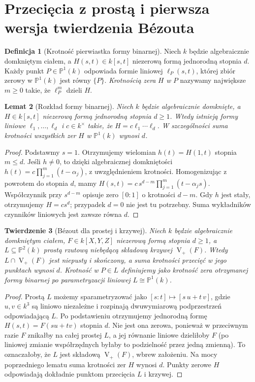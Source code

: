 \documentclass[11pt,a4paper,openany]{report}
\numberwithin{equation}{section}
\theoremstyle{plain}
\newtheorem{twierdzenie}{Twierdzenie}[section]
\newtheorem{lemat}[twierdzenie]{Lemat}
\theoremstyle{definition}
\newtheorem{definicja}[twierdzenie]{Definicja}
\theoremstyle{remark}
\newcommand{\PP}{\mathbb P}
\newcommand{\V}{\operatorname V}
\begin{document}
\section{Przecięcia z prostą i pierwsza wersja twierdzenia Bézouta}

\begin{definicja}[Krotność pierwiastka formy binarnej]
Niech $k$ będzie algebraicznie domkniętym ciałem,
a $H(s,t)\in k[s,t]$ niezerową formą jednorodną stopnia $d$.
Każdy punkt $P\in\PP^1(k)$ odpowiada formie liniowej
$\ell_P(s,t)$, której zbiór zerowy w $\PP^1(k)$ jest
równy $\{P\}$. \emph{Krotnością zera $H$ w $P$} nazywamy
największe $m\ge0$ takie, że $\ell_P^m$ dzieli $H$.
\end{definicja}

\begin{lemat}[Rozkład formy binarnej]
Niech $k$ będzie algebraicznie domknięte,
a $H\in k[s,t]$ niezerową formą jednorodną stopnia $d\ge1$.
Wtedy istnieją formy liniowe $\ell_1,\ldots,\ell_d$
i $c\in k^\times$ takie, że $H=c\ell_1\cdots\ell_d$.
W szczególności suma krotności wszystkich zer $H$ w $\PP^1(k)$
wynosi $d$.
\end{lemat}
\begin{proof}
Podstawmy $s=1$. Otrzymujemy wielomian
$h(t)=H(1,t)$ stopnia $m\le d$.
Jeśli $h\ne0$, to dzięki algebraicznej domkniętości
$h(t)=c\prod_{j=1}^m(t-\alpha_j)$, z uwzględnieniem krotności.
Homogenizując z powrotem do stopnia $d$, mamy
$H(s,t)=c\,s^{d-m}\prod_{j=1}^m(t-\alpha_js)$.
Współczynnik przy $s^{d-m}$ opisuje zero $[0:1]$
o krotności $d-m$. Gdy $h$ jest stały, otrzymujemy
$H=cs^d$; przypadek $d=0$ nie jest tu potrzebny.
Suma wykładników czynników liniowych jest zawsze równa $d$.
\end{proof}

\begin{twierdzenie}[Bézout dla prostej i krzywej]
\label{tw:bezout-line}
Niech $k$ będzie algebraicznie domkniętym ciałem,
$F\in k[X,Y,Z]$ niezerową formą stopnia $d\ge1$,
a $L\subseteq\PP^2(k)$ prostą rzutową niebędącą
składową krzywej $\V_+(F)$. Wtedy $L\cap\V_+(F)$
jest niepusty i skończony, a suma krotności przecięć
w jego punktach wynosi $d$. Krotność w $P\in L$
definiujemy jako krotność zera otrzymanej formy binarnej
po parametryzacji liniowej $L\cong\PP^1(k)$.
\end{twierdzenie}
\begin{proof}
Prostą $L$ możemy sparametryzować jako
$[s:t]\mapsto[s\,u+t\,v]$, gdzie $u,v\in k^3$
są liniowo niezależne i rozpinają dwuwymiarową
podprzestrzeń odpowiadającą $L$. Po podstawieniu
otrzymujemy jednorodną formę $H(s,t)=F(su+tv)$ stopnia $d$.
Nie jest ona zerowa, ponieważ w przeciwnym razie $F$
znikałby na całej prostej $L$, a jej równanie liniowe
dzieliłoby $F$ (po liniowej zmianie współrzędnych
byłaby to podzielność przez jedną zmienną). To oznaczałoby,
że $L$ jest składową $\V_+(F)$, wbrew założeniu.
Na mocy poprzedniego lematu suma krotności zer $H$
wynosi $d$. Punkty zerowe $H$ odpowiadają dokładnie
punktom przecięcia $L$ i krzywej.
\end{proof}
\end{document}
